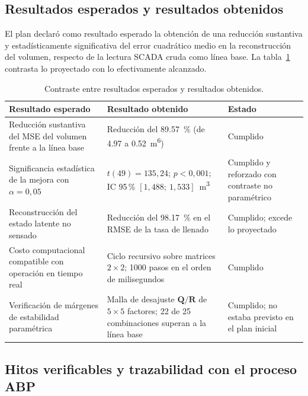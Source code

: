 \subsection{Resultados esperados y resultados obtenidos}

El plan declaró como resultado esperado la obtención de una reducción
sustantiva y estadísticamente significativa del error cuadrático medio en la
reconstrucción del volumen, respecto de la lectura SCADA cruda como línea base.
La tabla~\ref{tab:esperado-obtenido} contrasta lo proyectado con lo
efectivamente alcanzado.

\begin{table}[H]
\centering
\caption{Contraste entre resultados esperados y resultados obtenidos.}
\label{tab:esperado-obtenido}
\footnotesize
\begin{tabular}{@{}p{4.6cm}p{4.2cm}p{4.6cm}@{}}
\toprule
\textbf{Resultado esperado} & \textbf{Resultado obtenido} & \textbf{Estado}\\
\midrule
Reducción sustantiva del MSE del volumen frente a la línea base &
Reducción del \SI{89,57}{\percent} (de \num{4,97} a \SI{0,52}{\metre\tothe{6}}) &
Cumplido\\
\addlinespace
Significancia estadística de la mejora con $\alpha = 0{,}05$ &
$t(49) = 135{,}24$; $p < 0{,}001$; IC 95\,\% $[1{,}488;\ 1{,}533]$~\si{\metre\cubed} &
Cumplido y reforzado con contraste no paramétrico\\
\addlinespace
Reconstrucción del estado latente no sensado &
Reducción del \SI{98,17}{\percent} en el RMSE de la tasa de llenado &
Cumplido; excede lo proyectado\\
\addlinespace
Costo computacional compatible con operación en tiempo real &
Ciclo recursivo sobre matrices $2\times2$; \num{1000} pasos en el orden de
milisegundos &
Cumplido\\
\addlinespace
Verificación de márgenes de estabilidad paramétrica &
Malla de desajuste $\mathbf{Q}/\mathbf{R}$ de $5\times5$ factores; 22 de 25
combinaciones superan a la línea base &
Cumplido; no estaba previsto en el plan inicial\\
\bottomrule
\end{tabular}
\end{table}

\subsection{Hitos verificables y trazabilidad con el proceso ABP}

